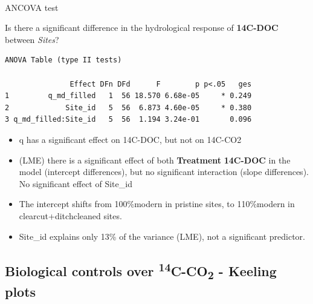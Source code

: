 \documentclass[
]{article}
\makeatletter
\let\oldparagraph\paragraph
\renewcommand{\paragraph}{
    \@ifstar
      \xxxParagraphStar
      \xxxParagraphNoStar
  }
\newcommand{\xxxParagraphStar}[1]{\oldparagraph*{#1}\mbox{}}
\newcommand{\xxxParagraphNoStar}[1]{\oldparagraph{#1}\mbox{}}
\makeatother
\begin{document}
\paragraph{ANCOVA test}\label{ancova-test-2}

Is there a significant difference in the hydrological response of
\textbf{14C-DOC} between \emph{Sites}?

\begin{verbatim}
ANOVA Table (type II tests)

               Effect DFn DFd      F        p p<.05   ges
1         q_md_filled   1  56 18.570 6.68e-05     * 0.249
2             Site_id   5  56  6.873 4.60e-05     * 0.380
3 q_md_filled:Site_id   5  56  1.194 3.24e-01       0.096
\end{verbatim}

\begin{tcolorbox}[enhanced jigsaw, coltitle=black, opacitybacktitle=0.6, left=2mm, bottomtitle=1mm, colback=white, toprule=.15mm, arc=.35mm, toptitle=1mm, leftrule=.75mm, rightrule=.15mm, colbacktitle=quarto-callout-note-color!10!white, breakable, titlerule=0mm, bottomrule=.15mm, colframe=quarto-callout-note-color-frame, title=\textcolor{quarto-callout-note-color}{\faInfo}\hspace{0.5em}{Interpretation}, opacityback=0]

\begin{itemize}
\item
  q has a significant effect on 14C-DOC, but not on 14C-CO2
\item
  (LME) there is a significant effect of both \textbf{Treatment}
  \textbf{14C-DOC} in the model (intercept differences), but no
  significant interaction (slope differences). No significant effect of
  Site\_id
\item
  The intercept shifts from 100\%modern in pristine sites, to
  110\%modern in clearcut+ditchcleaned sites.
\item
  Site\_id explains only 13\% of the variance (LME), not a significant
  predictor.
\end{itemize}

\end{tcolorbox}

\subsection{\texorpdfstring{Biological controls over
\textsuperscript{14}C-CO\textsubscript{2} - Keeling
plots}{Biological controls over 14C-CO2 - Keeling plots}}\label{biological-controls-over-14c-co2---keeling-plots}
\end{document}
